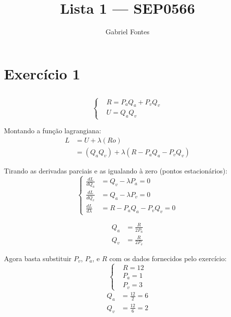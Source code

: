 \documentclass{article}
\title{Lista 1 --- SEP0566}
\author{Gabriel Fontes}
\begin{document}
\maketitle

\section{Exercício 1}
\subsection{}
\subsection{}
\subsection{}

\[
	\left\{
	\begin{aligned}
		 & R = P_a Q_a + P_v Q_v \\
		 & U = Q_a Q_v
	\end{aligned}
	\right.
\]

Montando a função lagrangiana:
\[
	\begin{aligned}
		L & = U + \lambda(Ro)                            \\
		  & = (Q_a Q_v) + \lambda(R - P_a Q_a - P_v Q_v)
	\end{aligned}
\]

Tirando as derivadas parciais e as igualando à zero (pontos estacionários):
\[
	\left\{
	\begin{aligned}
		\frac{dL}{dQ_a}     & = Q_v - \lambda P_a = 0     \\
		\frac{dL}{dQ_v}     & = Q_a - \lambda P_v = 0     \\
		\frac{dL}{d\lambda} & = R - P_a Q_a - P_v Q_v = 0
	\end{aligned}
	\right.
\]

\[
	\begin{aligned}
		Q_a & = \frac{R}{2P_a} \\
		Q_v & = \frac{R}{2P_v}
	\end{aligned}
\]

Agora basta substituir \(P_v\), \(P_a\), e \(R\) com os dados fornecidos pelo
exercício:
\[
	\left\{
	\begin{aligned}
		 & R = 12  \\
		 & P_a = 1 \\
		 & P_v = 3
	\end{aligned}
	\right.
\]
\[
	\begin{aligned}
		Q_a & = \frac{12}{2} = 6 \\
		Q_v & = \frac{12}{6} = 2
	\end{aligned}
\]
\end{document}
